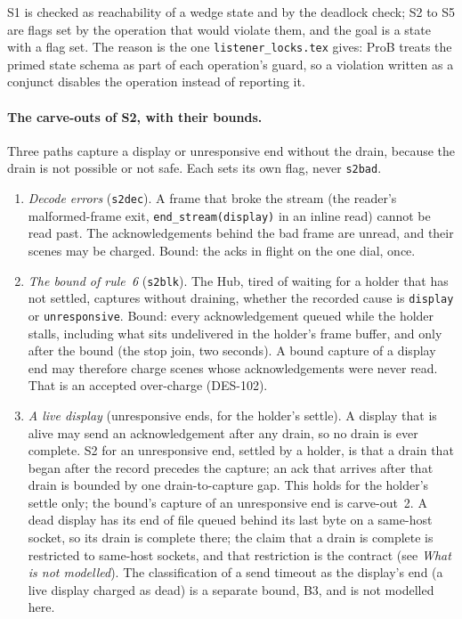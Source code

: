 \documentclass[a4paper,10pt,fleqn]{article}
\begin{document}
S1 is checked as reachability of a wedge state and by the deadlock check; S2 to
S5 are flags set by the operation that would violate them, and the goal is a
state with a flag set.  The reason is the one \texttt{listener\_locks.tex}
gives: ProB treats the primed state schema as part of each operation's guard, so
a violation written as a conjunct disables the operation instead of reporting
it.

\paragraph{The carve-outs of S2, with their bounds.}
Three paths capture a display or unresponsive end without the drain, because the
drain is not possible or not safe.  Each sets its own flag, never \texttt{s2bad}.
\begin{enumerate}
  \item \emph{Decode errors} (\texttt{s2dec}).  A frame that broke the stream
    (the reader's malformed-frame exit, \texttt{end\_stream(display)} in an
    inline read) cannot be read past.  The acknowledgements behind the bad frame
    are unread, and their scenes may be charged.  Bound: the acks in flight on the
    one dial, once.
  \item \emph{The bound of rule~6} (\texttt{s2blk}).  The Hub, tired of waiting
    for a holder that has not settled, captures without draining, whether the
    recorded cause is \texttt{display} or \texttt{unresponsive}.  Bound: every
    acknowledgement queued while the holder stalls, including what sits
    undelivered in the holder's frame buffer, and only after the bound (the stop
    join, two seconds).  A bound capture of a display end may therefore charge
    scenes whose acknowledgements were never read.  That is an accepted
    over-charge (DES-102).
  \item \emph{A live display} (unresponsive ends, for the holder's settle).  A
    display that is alive may send an acknowledgement after any drain, so no
    drain is ever complete.  S2 for an unresponsive end, settled by a holder, is
    that a drain that began after the record precedes the capture; an ack that
    arrives after that drain is bounded by one drain-to-capture gap.  This holds
    for the holder's settle only; the bound's capture of an unresponsive end is
    carve-out~2.  A dead display has its end of file queued behind its last byte
    on a same-host socket, so its drain is complete there; the claim that a drain
    is complete is restricted to same-host sockets, and that restriction is the
    contract (see \emph{What is not modelled}).  The classification of a
    send timeout as the display's end (a live display charged as dead) is a
    separate bound, B3, and is not modelled here.
\end{enumerate}
\end{document}
